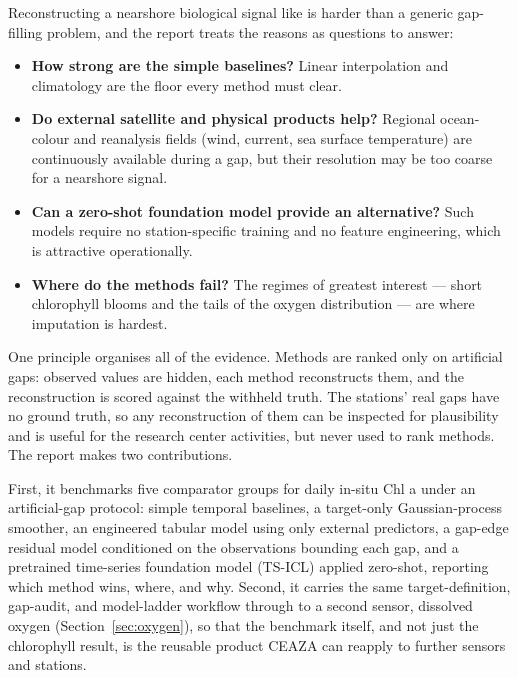 Reconstructing a nearshore biological signal like \chl{} is harder than a generic gap-filling
problem, and the report treats the reasons as questions to answer:
\begin{itemize}
    \item \textbf{How strong are the simple baselines?} Linear interpolation and climatology are the floor every method must clear.
    
    \item \textbf{Do external satellite and physical products help?} Regional ocean-colour and reanalysis fields (wind, current, sea surface temperature) are continuously available during a gap, but their resolution may be too coarse for a nearshore signal.

    \item \textbf{Can a zero-shot foundation model provide an alternative?} Such models require no station-specific training and no feature engineering, which is attractive operationally.

    \item \textbf{Where do the methods fail?} The regimes of greatest interest --- short chlorophyll blooms and the tails of the oxygen distribution --- are where imputation is hardest.
\end{itemize}
 
One principle organises all of the evidence. Methods are ranked only on artificial gaps: observed values are hidden, each method reconstructs them, and the reconstruction is
scored against the withheld truth. The stations' real gaps have no ground truth, so any
reconstruction of them can be inspected for plausibility and is useful for the research center activities, but never used to rank methods. \\
The report makes two contributions.

First, it benchmarks five comparator groups for daily in-situ Chl a under an artificial-gap protocol: simple temporal baselines, a target-only Gaussian-process
smoother, an engineered tabular model using only external predictors, a gap-edge residual model
conditioned on the observations bounding each gap, and a pretrained time-series foundation model
(TS-ICL) applied zero-shot, reporting which method wins, where, and why.
Second, it carries the same target-definition, gap-audit, and model-ladder workflow through to a
second sensor, dissolved oxygen (Section~\ref{sec:oxygen}), so that the benchmark itself, and not
just the chlorophyll result, is the reusable product CEAZA can reapply to further sensors and
stations.

